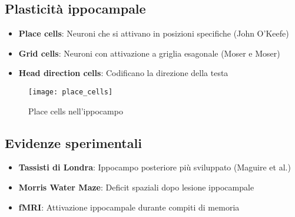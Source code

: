 \documentclass[11pt]{article}
\begin{document}
\subsection*{Plasticità ippocampale}
\begin{itemize}
    \item \textbf{Place cells}: Neuroni che si attivano in posizioni specifiche (John O'Keefe)
    \item \textbf{Grid cells}: Neuroni con attivazione a griglia esagonale (Moser e Moser)
    \item \textbf{Head direction cells}: Codificano la direzione della testa
\end{itemize}

\begin{figure}[h]
    \centering
    \texttt{[image: place\_cells]} %
    \caption{Place cells nell'ippocampo}
    \label{fig:place_cells}
\end{figure}

\subsection*{Evidenze sperimentali}
\begin{itemize}
    \item \textbf{Tassisti di Londra}: Ippocampo posteriore più sviluppato (Maguire et al.)
    \item \textbf{Morris Water Maze}: Deficit spaziali dopo lesione ippocampale
    \item \textbf{fMRI}: Attivazione ippocampale durante compiti di memoria
\end{itemize}
\end{document}
